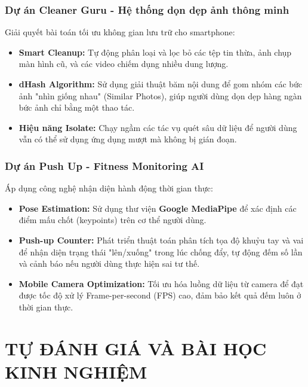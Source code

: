 \documentclass[12pt, a4paper]{article}
\begin{document}
\subsubsection{Dự án Cleaner Guru - Hệ thống dọn dẹp ảnh thông minh}
Giải quyết bài toán tối ưu không gian lưu trữ cho smartphone:
\begin{itemize}
    \item \textbf{Smart Cleanup:} Tự động phân loại và lọc bỏ các tệp tin thừa, ảnh chụp màn hình cũ, và các video chiếm dụng nhiều dung lượng.
    \item \textbf{dHash Algorithm:} Sử dụng giải thuật băm nội dung để gom nhóm các bức ảnh "nhìn giống nhau" (Similar Photos), giúp người dùng dọn dẹp hàng ngàn bức ảnh chỉ bằng một thao tác.
    \item \textbf{Hiệu năng Isolate:} Chạy ngầm các tác vụ quét sâu dữ liệu để người dùng vẫn có thể sử dụng ứng dụng mượt mà không bị gián đoạn.
\end{itemize}

\subsubsection{Dự án Push Up - Fitness Monitoring AI}
Áp dụng công nghệ nhận diện hành động thời gian thực:
\begin{itemize}
    \item \textbf{Pose Estimation:} Sử dụng thư viện \textbf{Google MediaPipe} để xác định các điểm mấu chốt (keypoints) trên cơ thể người dùng.
    \item \textbf{Push-up Counter:} Phát triển thuật toán phân tích tọa độ khuỷu tay và vai để nhận diện trạng thái "lên/xuống" trong lúc chống đẩy, tự động đếm số lần và cảnh báo nếu người dùng thực hiện sai tư thế.
    \item \textbf{Mobile Camera Optimization:} Tối ưu hóa luồng dữ liệu từ camera để đạt được tốc độ xử lý Frame-per-second (FPS) cao, đảm bảo kết quả đếm luôn ở thời gian thực.
\end{itemize}


\section{TỰ ĐÁNH GIÁ VÀ BÀI HỌC KINH NGHIỆM}
\end{document}
